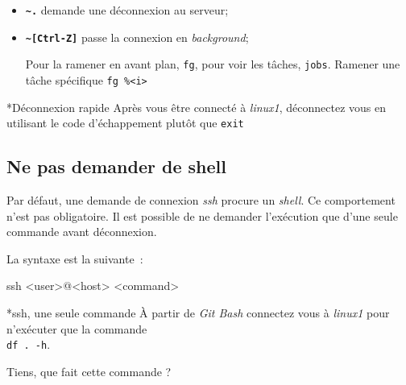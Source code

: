 \documentclass[a4paper,11pt]{article}
\begin{document}
\begin{itemize}
	\item \textbf{\texttt{\textasciitilde.}} demande une déconnexion au serveur;
	\item \textbf{\texttt{\textasciitilde[Ctrl-Z]}} passe la connexion en
		\textit{background};

		Pour la ramener en avant plan, \texttt{fg}, pour voir les tâches, 
		\texttt{jobs}. Ramener une tâche spécifique \texttt{fg \%<i>} 
\end{itemize}

\bigskip 
\begin{Exercice}*{Déconnexion rapide}
	Après vous être connecté à \textit{linux1}, déconnectez vous en utilisant le
	code d'échappement plutôt que \texttt{exit}

\end{Exercice}
\vfill

\subsection{Ne pas demander de shell}

Par défaut, une demande de connexion \textit{ssh} procure un \textit{shell}. Ce
comportement n'est pas obligatoire. Il est possible de ne demander l'exécution
que d'une seule commande avant déconnexion. 

La syntaxe est la suivante~:

\begin{Console}
	ssh <user>@<host> <command>
\end{Console}

\bigskip
\begin{Exercice}*{ssh, une seule commande}
	À partir de \textit{Git Bash} connectez vous à \textit{linux1} pour
	n'exécuter que la commande \\\texttt{df . -h}. 

	Tiens, que fait cette commande ? 

\end{Exercice}
\end{document}
